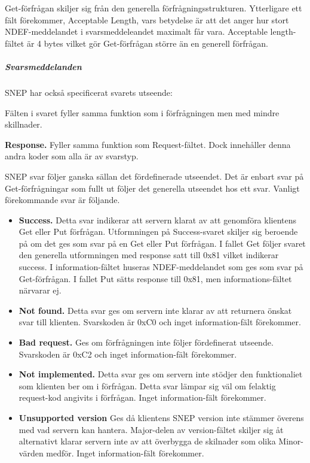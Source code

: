 \documentclass[11pt]{article}
\begin{document}

Get-förfrågan skiljer sig från den generella förfrågningsstrukturen. Ytterligare ett fält förekommer, Acceptable Length, vars betydelse är att det anger hur stort NDEF-meddelandet i svarsmeddeleandet maximalt får vara. Acceptable length-fältet är 4 bytes vilket gör Get-förfrågan större än en generell förfrågan.

\subparagraph{Svarsmeddelanden}
SNEP har också specificerat svarets utseende:


Fälten i svaret fyller samma funktion som i förfrågningen men med mindre skillnader.

\textbf{Response.} Fyller samma funktion som Request-fältet. Dock innehåller denna andra koder som alla är av svarstyp.

SNEP svar följer ganska sällan det fördefinerade utseendet. Det är enbart svar på Get-förfrågningar som fullt ut följer det generella utseendet hos ett svar. Vanligt förekommande svar är följande.

\begin{itemize}
\item \textbf{Success.} Detta svar indikerar att servern klarat av att genomföra klientens Get eller Put förfrågan. Utformningen på Success-svaret skiljer sig beroende på om det ges som svar på en Get eller Put förfrågan. I fallet Get följer svaret den generella utformningen med response satt till 0x81 vilket indikerar success. I information-fältet huseras NDEF-meddelandet som ges som svar på Get-förfrågan. I fallet Put sätts response till 0x81, men informations-fältet närvarar ej.
\item \textbf{Not found.} Detta svar ges om servern inte klarar av att returnera önskat svar till klienten. Svarskoden är 0xC0 och inget information-fält förekommer.
\item \textbf{Bad request.} Ges om förfrågningen inte följer fördefinerat utseende. Svarskoden är 0xC2 och inget information-fält förekommer.
\item \textbf{Not implemented.} Detta svar ges om servern inte stödjer den funktionaliet som klienten ber om i förfrågan. Detta svar lämpar sig väl om felaktig request-kod angivits i förfrågan. Inget information-fält förekommer.
\item \textbf{Unsupported version} Ges då klientens SNEP version inte stämmer överens med vad servern kan hantera. Major-delen av version-fältet skiljer sig åt alternativt klarar servern inte av att överbygga de skilnader som olika Minor-värden medför. Inget information-fält förekommer.
\end{itemize}
\end{document}
